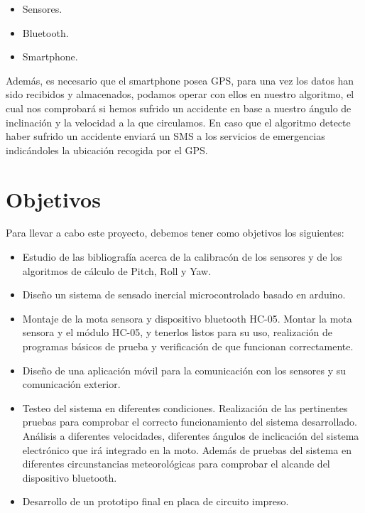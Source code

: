 		\begin{itemize}
			\item Sensores.
			\item Bluetooth.
			\item Smartphone.
		\end{itemize}
		
		Además, es necesario que el smartphone posea GPS, para una vez los datos han sido recibidos y almacenados, podamos operar con ellos en nuestro algoritmo, el cual nos comprobará si hemos sufrido un accidente en base a nuestro ángulo de inclinación y la velocidad a la que circulamos. En caso que el algoritmo detecte haber sufrido un accidente enviará un SMS a los servicios de emergencias indicándoles la ubicación recogida por el GPS.
	
	
	\section{Objetivos}
	
		Para llevar a cabo este proyecto, debemos tener como objetivos los siguientes:
		
		\begin{itemize}
			\item Estudio de las bibliografía acerca de la calibracón de los sensores y de los algoritmos de cálculo de Pitch, Roll y Yaw.
			
			\item Diseño un sistema de sensado inercial microcontrolado basado en arduino.
			
			\item Montaje de la mota sensora y dispositivo bluetooth HC-05. Montar la mota sensora y el módulo HC-05, y tenerlos listos para su uso, realización de programas básicos de prueba y verificación de que funcionan correctamente.
			
			\item Diseño de una aplicación móvil para la comunicación con los sensores y su comunicación exterior.
			
			\item Testeo del sistema en diferentes condiciones. Realización de las pertinentes pruebas para comprobar el correcto funcionamiento del sistema desarrollado. Análisis a diferentes velocidades, diferentes ángulos de inclicación del sistema electrónico que irá integrado en la moto. Además de pruebas del sistema en diferentes circunstancias meteorológicas para comprobar el alcande del dispositivo bluetooth.
			
			\item Desarrollo de un prototipo final en placa de circuito impreso.
			
		\end{itemize}
		
